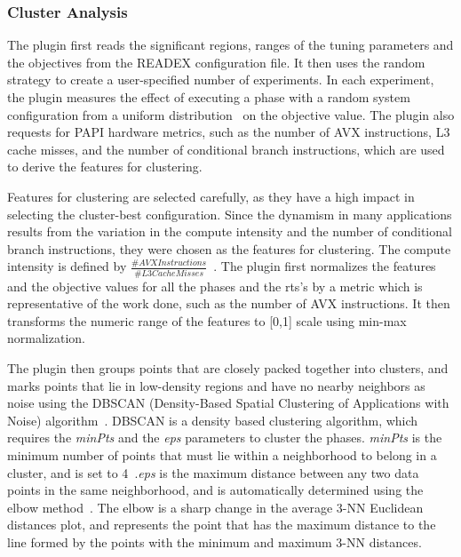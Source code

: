 \subsubsection{Cluster Analysis} \label{cluster-analysis} 

The plugin first reads the significant regions, ranges of the tuning parameters and the objectives from the READEX configuration file. It then uses the random strategy to create a user-specified number of experiments. In each experiment, the plugin measures the effect of executing a phase with a random system configuration from a uniform distribution~\cite{AutoTune:Book2015} on the objective value. The plugin also requests for PAPI hardware metrics, such as the number of AVX instructions, L3 cache misses, and the number of conditional branch instructions, which are used to derive the features for clustering.

Features for clustering are selected carefully, as they have a high impact in selecting the cluster-best configuration. Since the dynamism in many applications results from the variation in the compute intensity and the number of conditional branch instructions, they were chosen as the features for clustering. The compute intensity is defined by $\frac{\#AVX Instructions}{\#L3 Cache Misses}$~\cite{PDPTA_18_Kumaraswamy}. The plugin first normalizes the features and the objective values for all the phases and the rts’s by a metric which is representative of the work done, such as the number of AVX instructions. It then transforms the numeric range of the features to [0,1] scale using min-max normalization.

The plugin then groups points that are closely packed together into clusters, and marks points that lie in low-density regions and have no nearby neighbors as noise using the DBSCAN (Density-Based Spatial Clustering of Applications with Noise) algorithm~\cite{Ester-1996}. DBSCAN is a density based clustering algorithm, which requires the \textit{minPts} and the \textit{eps} parameters to cluster the phases. \textit{minPts} is the minimum number of points that must lie within a neighborhood to belong in a cluster, and is set to 4~\cite{Sander-1998}.\textit{eps} is the maximum distance between any two data points in the same neighborhood, and is automatically determined using the elbow method~\cite{gaonkar2013autoepsdbscan}. The elbow is a sharp change in the average 3-NN Euclidean distances plot, and represents the point that has the maximum distance to the line formed by the points with the minimum and maximum 3-NN distances.

